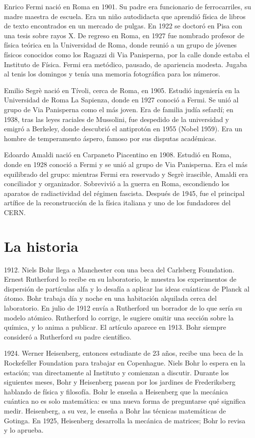 \documentclass[11pt,a4paper]{article}
\begin{document}
Enrico Fermi nació en Roma en 1901. Su padre era funcionario de ferrocarriles, su madre maestra de escuela. Era un niño autodidacta que aprendió física de libros de texto encontrados en un mercado de pulgas. En 1922 se doctoró en Pisa con una tesis sobre rayos X. De regreso en Roma, en 1927 fue nombrado profesor de física teórica en la Universidad de Roma, donde reunió a un grupo de jóvenes físicos conocidos como los Ragazzi di Via Panisperna, por la calle donde estaba el Instituto de Física. Fermi era metódico, pausado, de apariencia modesta. Jugaba al tenis los domingos y tenía una memoria fotográfica para los números.

Emilio Segrè nació en Tívoli, cerca de Roma, en 1905. Estudió ingeniería en la Universidad de Roma La Sapienza, donde en 1927 conoció a Fermi. Se unió al grupo de Via Panisperna como el más joven. Era de familia judía sefardí; en 1938, tras las leyes raciales de Mussolini, fue despedido de la universidad y emigró a Berkeley, donde descubrió el antiprotón en 1955 (Nobel 1959). Era un hombre de temperamento áspero, famoso por sus disputas académicas.

Edoardo Amaldi nació en Carpaneto Piacentino en 1908. Estudió en Roma, donde en 1928 conoció a Fermi y se unió al grupo de Via Panisperna. Era el más equilibrado del grupo: mientras Fermi era reservado y Segrè irascible, Amaldi era conciliador y organizador. Sobrevivió a la guerra en Roma, escondiendo los aparatos de radiactividad del régimen fascista. Después de 1945, fue el principal artífice de la reconstrucción de la física italiana y uno de los fundadores del CERN.

\section*{La historia}

1912. Niels Bohr llega a Manchester con una beca del Carlsberg Foundation. Ernest Rutherford lo recibe en su laboratorio, le muestra los experimentos de dispersión de partículas alfa y lo desafía a aplicar las ideas cuánticas de Planck al átomo. Bohr trabaja día y noche en una habitación alquilada cerca del laboratorio. En julio de 1912 envía a Rutherford un borrador de lo que sería su modelo atómico. Rutherford lo corrige, le sugiere omitir una sección sobre la química, y lo anima a publicar. El artículo aparece en 1913. Bohr siempre consideró a Rutherford su padre científico.

1924. Werner Heisenberg, entonces estudiante de 23 años, recibe una beca de la Rockefeller Foundation para trabajar en Copenhague. Niels Bohr lo espera en la estación; van directamente al Instituto y comienzan a discutir. Durante los siguientes meses, Bohr y Heisenberg pasean por los jardines de Frederiksberg hablando de física y filosofía. Bohr le enseña a Heisenberg que la mecánica cuántica no es solo matemática: es una nueva forma de preguntarse qué significa medir. Heisenberg, a su vez, le enseña a Bohr las técnicas matemáticas de Gotinga. En 1925, Heisenberg desarrolla la mecánica de matrices; Bohr lo revisa y lo aprueba.
\end{document}
